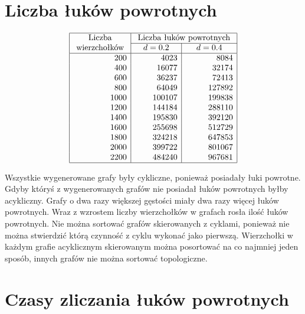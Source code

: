 \documentclass[polish,polish,a4paper]{article}
\begin{document}
\begin{spacing}{1.25}
\section{Liczba łuków powrotnych}

\begin{spacing}{1.5}
	\begin{equation*}
	\begin{array}{|r|r|r|}
	\hline
	\multicolumn{1}{|c|}{$ Liczba $}&\multicolumn{2}{c|}{$ Liczba łuków powrotnych $}\\\cline{2-3}
	\multicolumn{1}{|c|}{$ wierzchołków $}&	\multicolumn{1}{c|}{\quad d=0.2 \quad}&	\multicolumn{1}{c|}{d=0.4}\\
	\hline
	200&4023&8084\\
	400&16077&32174\\
	600&36237&72413\\
	800&64049&127892\\
	1000&100107&199838\\
	1200&144184&288110\\
	1400&195830&392120\\
	1600&255698&512729\\
	1800&324218&647853\\
	2000&399722&801067\\
	2200&484240&967681\\
	\hline
	\end{array}
	\end{equation*}
\end{spacing}

Wszystkie wygenerowane grafy były cykliczne, ponieważ posiadały łuki powrotne. Gdyby któryś z wygenerowanych grafów nie posiadał łuków powrotnych byłby acykliczny. Grafy o dwa razy większej gęstości miały dwa razy więcej łuków powrotnych. Wraz z wzrostem liczby wierzchołków w grafach rosła ilość łuków powrotnych.
Nie można sortować grafów skierowanych z cyklami, ponieważ nie można stwierdzić którą czynność z cyklu wykonać jako pierwszą.
Wierzchołki w każdym grafie acyklicznym skierowanym można posortować na co najmniej jeden sposób, innych grafów nie można sortować topologiczne.



\section{Czasy zliczania łuków powrotnych}

\end{spacing}
\end{document}
